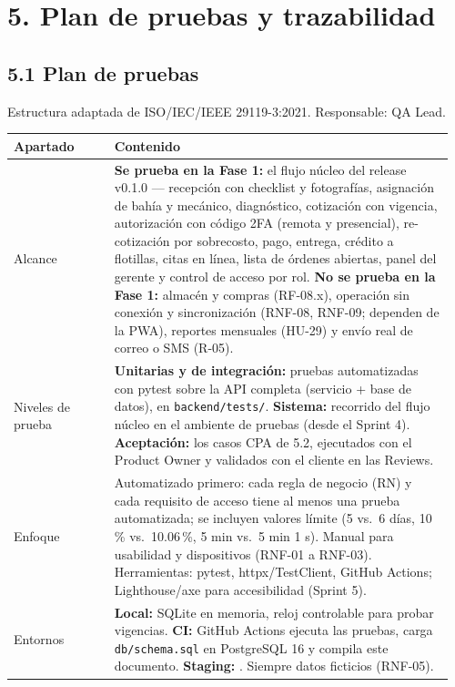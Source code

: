 \section{5. Plan de pruebas y
trazabilidad}\label{plan-de-pruebas-y-trazabilidad}

\subsection{5.1 Plan de pruebas}\label{plan-de-pruebas}

Estructura adaptada de ISO/IEC/IEEE 29119-3:2021. Responsable: QA Lead.

{\small
\begin{longtable}{@{}L{0.22\linewidth}L{0.74\linewidth}@{}}
\toprule
\textbf{Apartado} & \textbf{Contenido} \\
\midrule
\endhead
\bottomrule
\endlastfoot
Alcance & \textbf{Se prueba en la Fase 1:} el flujo núcleo del release v0.1.0 --- recepción con checklist y
fotografías, asignación de bahía y mecánico, diagnóstico, cotización con vigencia, autorización con código
2FA (remota y presencial), re-cotización por sobrecosto, pago, entrega, crédito a flotillas, citas en línea,
lista de órdenes abiertas, panel del gerente y control de acceso por rol.
\textbf{No se prueba en la Fase 1:} almacén y compras (RF-08.x), operación sin conexión y sincronización
(RNF-08, RNF-09; dependen de la PWA), reportes mensuales (HU-29) y envío real de correo o SMS (R-05). \\
Niveles de prueba & \textbf{Unitarias y de integración:} pruebas automatizadas con pytest sobre la API completa
(servicio + base de datos), en \texttt{backend/tests/}. \textbf{Sistema:} recorrido del flujo núcleo en el
ambiente de pruebas (desde el Sprint 4). \textbf{Aceptación:} los casos CPA de 5.2, ejecutados con el
Product Owner y validados con el cliente en las Reviews. \\
Enfoque & Automatizado primero: cada regla de negocio (RN) y cada requisito de acceso tiene al menos una
prueba automatizada; se incluyen valores límite (5 vs.\ 6 días, 10\,\% vs.\ 10.06\,\%, 5 min vs.\ 5 min 1 s).
Manual para usabilidad y dispositivos (RNF-01 a RNF-03). Herramientas: pytest, httpx/TestClient,
GitHub Actions; Lighthouse/axe para accesibilidad (Sprint 5). \\
Entornos & \textbf{Local:} SQLite en memoria, reloj controlable para probar vigencias.
\textbf{CI:} GitHub Actions ejecuta las pruebas, carga \texttt{db/schema.sql} en PostgreSQL 16 y compila este
documento. \textbf{Staging:} . Siempre datos ficticios (RNF-05). \\

\end{longtable}}
